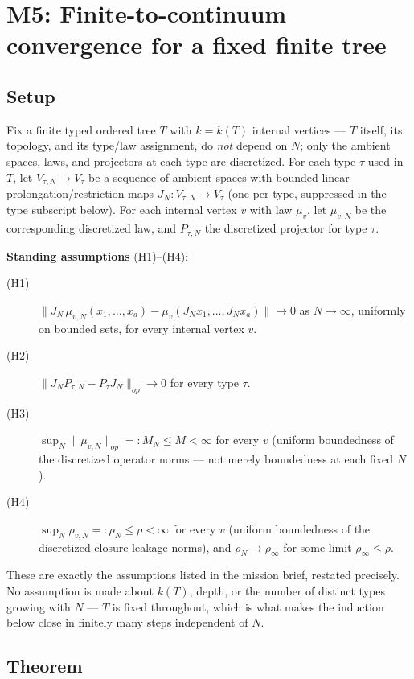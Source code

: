 \section*{M5: Finite-to-continuum convergence for a fixed finite tree}

\subsection*{Setup}

Fix a finite typed ordered tree $T$ with $k=k(T)$ internal vertices —
$T$ itself, its topology, and its type/law assignment, do \emph{not}
depend on $N$; only the ambient spaces, laws, and projectors at each
type are discretized. For each type $\tau$ used in $T$, let
$V_{\tau,N}\to V_\tau$ be a sequence of ambient spaces with bounded
linear prolongation/restriction maps $J_N:V_{\tau,N}\to V_\tau$ (one per
type, suppressed in the type subscript below). For each internal vertex
$v$ with law $\mu_v$, let $\mu_{v,N}$ be the corresponding discretized
law, and $P_{\tau,N}$ the discretized projector for type $\tau$.

\textbf{Standing assumptions} (H1)–(H4):
\begin{description}
  \item[(H1)] $\|J_N\,\mu_{v,N}(x_1,\dots,x_a) - \mu_v(J_N x_1,\dots,J_N x_a)\| \to 0$
    as $N\to\infty$, uniformly on bounded sets, for every internal vertex $v$.
  \item[(H2)] $\|J_N P_{\tau,N} - P_\tau J_N\|_{op} \to 0$ for every type $\tau$.
  \item[(H3)] $\sup_N \|\mu_{v,N}\|_{op} =: M_N \le M < \infty$ for every $v$
    (uniform boundedness of the discretized operator norms — not merely
    boundedness at each fixed $N$).
  \item[(H4)] $\sup_N \rho_{v,N} =: \rho_N \le \rho < \infty$ for every $v$
    (uniform boundedness of the discretized closure-leakage norms), and
    $\rho_N \to \rho_\infty$ for some limit $\rho_\infty \le \rho$.
\end{description}

These are exactly the assumptions listed in the mission brief, restated
precisely. No assumption is made about $k(T)$, depth, or the number of
distinct types growing with $N$ — $T$ is fixed throughout, which is what
makes the induction below close in finitely many steps independent of
$N$.

\subsection*{Theorem}

